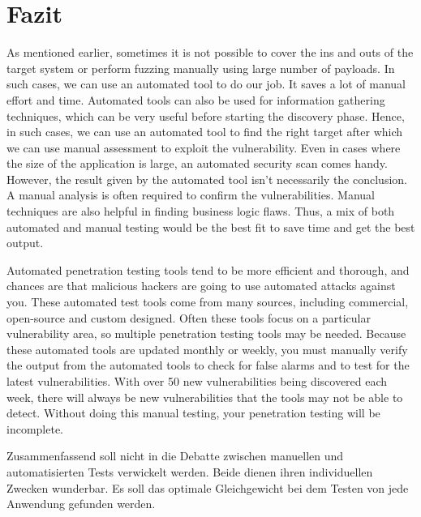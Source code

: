 \chapter{Fazit}
\label{cha:k7}

As mentioned earlier, sometimes it is not possible to cover the ins and outs of the target system or perform fuzzing manually using large number of payloads. In such cases, we can use an automated tool to do our job. It saves a lot of manual effort and time.
Automated tools can also be used for information gathering techniques, which can be very useful before starting the discovery phase. Hence, in such cases, we can use an automated tool to find the right target after which we can use manual assessment to exploit the vulnerability. Even in cases where the size of the application is large, an automated security scan comes handy. However, the result given by the automated tool isn’t necessarily the conclusion. A manual analysis is often required to confirm the vulnerabilities. Manual techniques are also helpful in finding business logic flaws. Thus, a mix of both automated and manual testing would be the best fit to save time and get the best output.



Automated penetration testing tools tend to be more efficient and thorough, and chances are that malicious hackers are going to use automated attacks against you. These automated test tools come from many sources, including commercial, open-source and custom designed. Often these tools focus on a particular vulnerability area, so multiple penetration testing tools may be needed. Because these automated tools are updated monthly or weekly, you must manually verify the output from the automated tools to check for false alarms and to test for the latest vulnerabilities. With over 50 new vulnerabilities being discovered each week, there will always be new vulnerabilities that the tools may not be able to detect. Without doing this manual testing, your penetration testing will be incomplete. 

Zusammenfassend soll nicht in die Debatte zwischen manuellen und automatisierten Tests verwickelt werden. Beide dienen ihren individuellen Zwecken wunderbar. Es soll das optimale Gleichgewicht bei dem Testen von jede Anwendung gefunden werden.